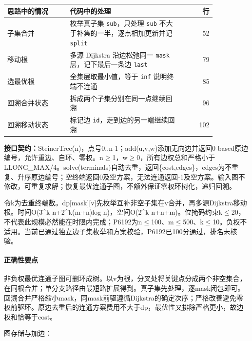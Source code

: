 \begin{center}\small
\begin{tabular}{@{}p{0.30\linewidth}p{0.55\linewidth}r@{}}
\toprule
思路中的情况 & 代码中的处理 & 行\\
\midrule
子集合并 & 枚举真子集 \texttt{sub}，只处理 \texttt{sub} 不大于补集的一半，逐点相加更新并记 \texttt{split} & 52\\
移动根 & 多源 Dijkstra 沿边松弛同一 \texttt{mask} 层，记下最后一条边 \texttt{last} & 79\\
选最优根 & 全集层取最小值，等于 \texttt{inf} 说明终端不连通 & 85\\
回溯合并状态 & 拆成两个子集分别在同一点继续回溯 & 96\\
回溯移动状态 & 标记边 \texttt{id}，走到边的另一端继续回溯 & 102\\
\bottomrule
\end{tabular}
\end{center}



{\sloppy{}\noindent\textbf{接口契约：}SteinerTree(n)，点号0..n-1；add(u,v,w)添加无向边并返回0-based原边编号，允许重边、自环、零权。n$\ge$1，w$\ge$0，所有边权总和严格小于LLONG\_MAX/4。solve(terminals)自动去重，返回\{cost,edges\}，edges为不重复、升序原边编号；空终端返回0及空方案，无法连通返回-1及空方案。输入图不修改，可重复求解；恢复最优连通子图，不额外保证零权环树化，递归回溯。

令k为去重终端数。dp[mask][v]先枚举互补非空子集在v合并，再多源Dijkstra移动根。时间O(3\textasciicircum{}k n+2\textasciicircum{}k(m+n)log n)，空间O(2\textasciicircum{}k n+n+m)。位掩码约束k$\le$20，不代表此规模必然能在时限内完成；P6192为n$\le$100、m$\le$500、k$\le$10。负权不适用。当前已通过独立边子集枚举和方案校验，P6192已100分通过，排名未核验。\par}

\paragraph{正确性要点} 非负权最优连通子图可删环成树。以v为根，分叉处将关键点分成两个非空集合，在同根合并；单分支路径由最短路扩展得到。真子集先处理，逐mask闭包即可。回溯合并严格缩小mask，同mask前驱遵循Dijkstra的确定次序；严格改善避免零权前驱环。原边去重后的连通方案费用不大于dp，最优性又排除严格更小，故边权和恰等于cost。

\newpage\noindent 图存储与加边：



